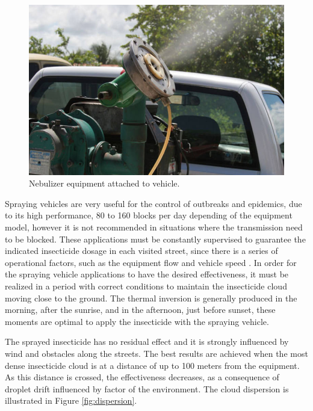 \documentclass[a4paper,11pt]{article}
\begin{document}
\begin{figure}[!ht]
  \centering
    \includegraphics[scale=0.4]{fumace.jpg}
    \caption{Nebulizer equipment attached to vehicle. }
    \label{fig:nebulizer}
\end{figure}

Spraying vehicles  are very useful for  the control of outbreaks  and epidemics,
due to its high performance, 80 to 160 blocks per day depending of the equipment
model, however it  is not recommended in situations where  the transmission need
to be blocked. These applications must be constantly supervised to guarantee the
indicated insecticide dosage in each visited  street, since there is a series of
operational   factors,  such   as   the  equipment   flow   and  vehicle   speed
\citep{brasil-dept-helth:2009}. In  order for the spraying  vehicle applications
to have the desired effectiveness, it must  be realized in a period with correct
conditions to  maintain the insecticide  cloud moving  close to the  ground. The
thermal inversion is  generally produced in the morning, after  the sunrise, and
in the  afternoon, just before  sunset, these moments  are optimal to  apply the
insecticide with the spraying vehicle.

The sprayed insecticide has no residual  effect and it is strongly influenced by
wind and  obstacles along the  streets. The best  results are achieved  when the
most dense  insecticide cloud  is at  a distance of  up to  100 meters  from the
equipment.  As this  distance  is  crossed, the  effectiveness  decreases, as  a
consequence of droplet drift influenced by  factor of the environment. The cloud
dispersion is illustrated in Figure \ref{fig:dispersion}.
\end{document}
